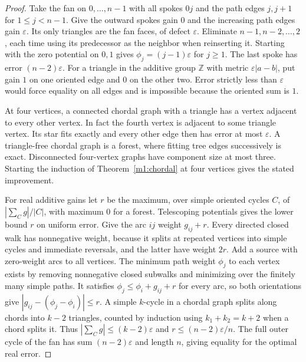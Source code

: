 \documentclass[11pt,reqno]{amsart}
\theoremstyle{definition}
\theoremstyle{remark}
\numberwithin{equation}{section}
\begin{document}
\begin{proof}
Take the fan on \(0,\ldots,n-1\) with all spokes \(0j\) and the
path edges \(j,j+1\) for \(1\le j<n-1\). Give the outward spokes
gain \(0\) and the increasing path edges gain \(\varepsilon\).
Its only triangles are the fan faces, of defect \(\varepsilon\).
Eliminate \(n-1,n-2,\ldots,2\), each time using its predecessor
as the neighbor when reinserting it. Starting with the zero
potential on \(0,1\) gives \(\phi_j=(j-1)\varepsilon\)
for \(j\ge1\). The last spoke has error \((n-2)\varepsilon\).
For a triangle in the additive group \(\mathbb Z\) with metric
\(\varepsilon|a-b|\), put gain \(1\) on one oriented edge and \(0\)
on the other two. Error strictly less than \(\varepsilon\) would
force equality on all edges and is impossible because the oriented
sum is \(1\).

At four vertices, a connected chordal graph with a triangle has
a vertex adjacent to every other vertex. In fact the fourth vertex
is adjacent to some triangle vertex. Its star fits exactly and
every other edge then has error at most \(\varepsilon\). A triangle-free
chordal graph is a forest, where fitting tree edges successively
is exact. Disconnected four-vertex graphs have component size at
most three. Starting the induction of Theorem~\ref{m1:chordal}
at four vertices gives the stated improvement.

For real additive gains let \(r\) be the maximum, over simple
oriented cycles \(C\), of \(|\sum_C g|/|C|\), with maximum \(0\)
for a forest. Telescoping potentials gives the lower bound \(r\)
on uniform error. Give the arc \(ij\) weight \(g_{ij}+r\).
Every directed closed walk has nonnegative weight, because it
splits at repeated vertices into simple cycles and immediate
reversals, and the latter have weight \(2r\). Add a source
with zero-weight arcs to all vertices. The minimum path weight
\(\phi_j\) to each vertex exists by removing nonnegative closed
subwalks and minimizing over the finitely many simple paths.
It satisfies \(\phi_j\le\phi_i+g_{ij}+r\) for every arc, so both
orientations give \(|g_{ij}-(\phi_j-\phi_i)|\le r\).
A simple \(k\)-cycle in a chordal graph splits along chords into
\(k-2\) triangles, counted by induction using
\(k_1+k_2=k+2\) when a chord splits it. Thus
\(|\sum_C g|\le(k-2)\varepsilon\) and \(r\le(n-2)\varepsilon/n\).
The full outer cycle of the fan has sum \((n-2)\varepsilon\)
and length \(n\), giving equality for the optimal real error.
\end{proof}
\end{document}
